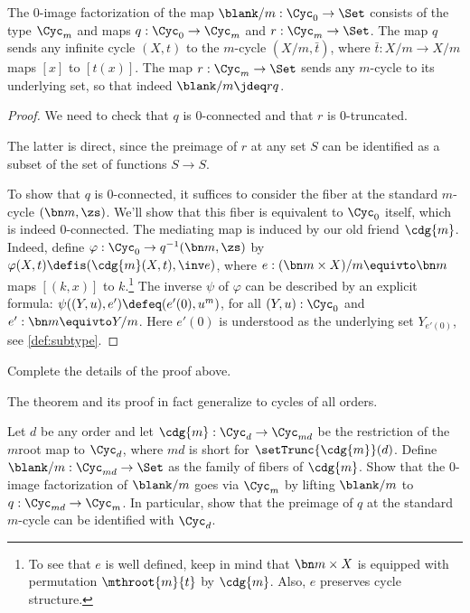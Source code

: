 \begin{theorem}\label{thm:image-Z-to-Cm}
  The $0$-image factorization of the map $\blank/m : \Cyc_0 \to \Set$
  consists of the type $\Cyc_m$ and maps $q : \Cyc_0 \to \Cyc_m$
  and $r:\Cyc_m\to\Set$. The map $q$
  sends any infinite cycle $(X,t)$ to the $m$-cycle $(X/m,\bar t)$,
  where $\bar t : X/m \to X/m$ maps $[x]$ to $[t(x)]$. The map
  $r:\Cyc_m\to\Set$ sends any $m$-cycle to its underlying set,
  so that indeed $\blank/m \jdeq rq$.
\end{theorem}

\begin{proof}
  We need to check that $q$ is $0$-connected
  and that $r$ is $0$-truncated.

  The latter is direct, since the preimage of $r$ at any set $S$
  can be identified as a subset of the set of functions $S\to S$.

  To show that $q$ is $0$-connected,
  it suffices to consider the fiber at the standard $m$-cycle $(\bn m,\zs)$.
  We'll show that this fiber is equivalent to $\Cyc_0$ itself,
  which is indeed $0$-connected.
  The mediating map is induced by our old friend $\cdg{m}$.
  Indeed, define $\varphi : \Cyc_0 \to q^{-1}(\bn m,\zs)$
  by $\varphi(X,t)\defis(\cdg{m}(X,t),\inv e)$, where
  $e: (\bn m\times X)/m \equivto \bn m$ maps $[(k,x)]$ to $k$.\footnote{%
  To see that $e$ is well defined, keep in mind that $\bn m\times X$
  is equipped with permutation $\mthroot{m}{t}$ by $\cdg{m}$. Also,
  $e$ preserves cycle structure.}
  The inverse $\psi$ of $\varphi$ can be described by an explicit formula:
  $\psi((Y,u),e')\defeq(e'(0), u^m)$, for all
  $(Y,u):\Cyc_0$ and $e' : \bn m \equivto Y/m$.
  Here $e'(0)$ is understood as the underlying set $Y_{e'(0)}$,
  see \cref{def:subtype}. 
\end{proof}

\begin{xca}\label{xca:image-Z-to-Cm}
  Complete the details of the proof above.
\end{xca}

The theorem and its proof in fact generalize to cycles of all orders.

\begin{xca}\label{xca:image-Cmd-to-Cm}
  Let $d$ be any order and let $\cdg{m} : \Cyc_d\to\Cyc_{md}$
  be the restriction of the $m$\th root map to $\Cyc_d$, where
  $md$ is short for $\setTrunc{\cdg{m}}(d)$.
  Define $\blank/m : \Cyc_{md} \to \Set$ as the family of fibers
  of $\cdg{m}$.
  Show that the $0$-image factorization of $\blank/m$ goes via $\Cyc_m$ by
  lifting $\blank/m$ to $q : \Cyc_{md} \to \Cyc_m$.
  In particular, show that the preimage of $q$ at the standard $m$-cycle
  can be identified with $\Cyc_d$.
\end{xca}

